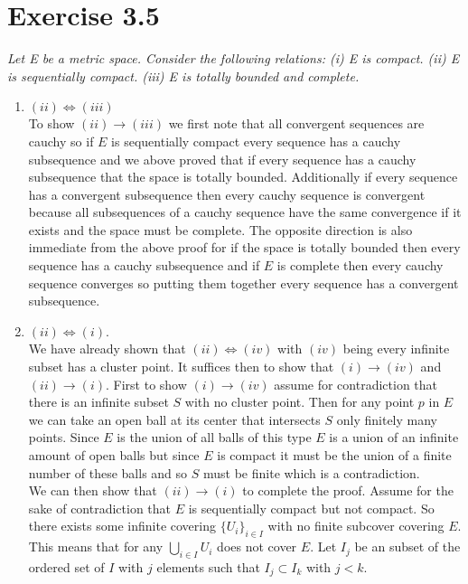 \documentclass{amsart}
\begin{document}
    \section{Exercise 3.5}
    \emph{Let E be a metric space. Consider the following relations:
    (i) E is compact. (ii) E is sequentially compact. (iii) E is totally bounded and complete.}
        
    \begin{enumerate}
        \item $(ii) \Leftrightarrow (iii)$\\
            To show $(ii) \rightarrow (iii)$ we first note that all convergent sequences are cauchy so if $E$ is sequentially compact every sequence has a cauchy subsequence and we above proved that if every sequence has a cauchy subsequence that the 
            space is totally bounded. Additionally if every sequence has a convergent subsequence then every cauchy sequence is convergent because all subsequences of a cauchy sequence have the same convergence if it exists and the space must be complete.
            The opposite direction is also immediate from the above proof for if the space is totally bounded then every sequence has a cauchy subsequence and if $E$ is complete then
            every cauchy sequence converges so putting them together every sequence has a convergent subsequence.
        \item $(ii) \Leftrightarrow (i)$.\\
            We have already shown that $(ii) \Leftrightarrow (iv)$ with $(iv)$ being every infinite subset has a cluster point. It suffices
            then to show that $(i) \rightarrow (iv)$ and $(ii) \rightarrow (i)$. First to show $(i) \rightarrow (iv)$ assume for contradiction that there is an infinite subset $S$ with no cluster point.
            Then for any point $p$ in $E$ we can take an open ball at its center that intersects $S$ only finitely many points.
            Since $E$ is the union of all balls of this type $E$ is a union of an infinite amount of open balls but since $E$ is compact it must be the union of a finite number of these
            balls and so  $S$ must be finite which is a contradiction.
            \\
            We can then show that $(ii) \rightarrow (i)$ to complete the proof. Assume for the sake
            of contradiction that $E$ is sequentially compact but not compact. So there exists some infinite covering  $\{U_i\}_{i\in I}$ with no finite subcover covering  $E$.
            This means that for any $\bigcup_{i \in I} U_i$ does not cover  $E$. Let $I_j$ be an subset of the ordered set of $I$ with $j$ elements such that $I_j \subset I_k$ with $j < k$.

\end{enumerate}
\end{document}
